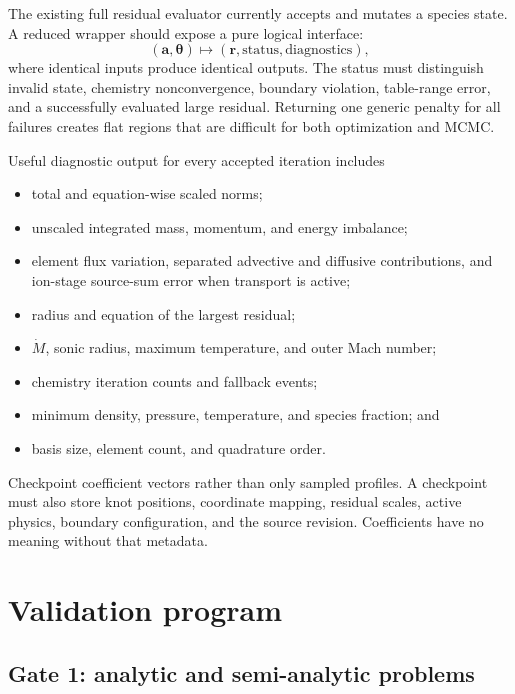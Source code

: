 \documentclass[english,a4paper]{my_memo}
\newcommand{\vect}[1]{\mathbf{#1}}
\newcommand{\coef}{\vect{a}}
\newcommand{\mdot}{\dot M}
\begin{document}
The existing full residual evaluator currently accepts and mutates a species
state.  A reduced wrapper should expose a pure logical interface:
\begin{equation}
 (\coef,\boldsymbol{\theta})\longmapsto
 (\vect{r},\text{status},\text{diagnostics}),
 \label{eq:pureinterface}
\end{equation}
where identical inputs produce identical outputs.  The status must distinguish
invalid state, chemistry nonconvergence, boundary violation, table-range error,
and a successfully evaluated large residual.  Returning one generic penalty for
all failures creates flat regions that are difficult for both optimization and
MCMC.

Useful diagnostic output for every accepted iteration includes
\begin{itemize}
\item total and equation-wise scaled norms;
\item unscaled integrated mass, momentum, and energy imbalance;
\item element flux variation, separated advective and diffusive contributions,
  and ion-stage source-sum error when transport is active;
\item radius and equation of the largest residual;
\item \(\mdot\), sonic radius, maximum temperature, and outer Mach number;
\item chemistry iteration counts and fallback events;
\item minimum density, pressure, temperature, and species fraction; and
\item basis size, element count, and quadrature order.
\end{itemize}

Checkpoint coefficient vectors rather than only sampled profiles.  A checkpoint
must also store knot positions, coordinate mapping, residual scales, active
physics, boundary configuration, and the source revision.  Coefficients have no
meaning without that metadata.

\section{Validation program}\label{sec:validation}

\subsection{Gate 1: analytic and semi-analytic problems}
\end{document}
